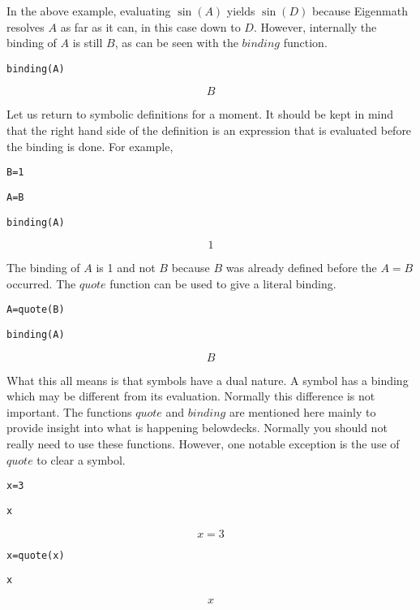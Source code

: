 \medskip
\noindent
In the above example, evaluating $\sin(A)$ yields $\sin(D)$ because Eigenmath
resolves $A$ as far as it can, in this case down to $D$.
However, internally the binding of $A$ is still $B$, as can be seen with
the $binding$ function.

\medskip
\verb$binding(A)$

$$B$$

\medskip
\noindent
Let us return to symbolic definitions for a moment.
It should be kept in mind that the right hand side of the definition is an
expression that is evaluated before the binding is done.
For example,

\medskip
\verb$B=1$

\verb$A=B$

\verb$binding(A)$

$$1$$

\medskip
\noindent
The binding of $A$ is 1 and not $B$ because $B$ was already defined before
the $A=B$ occurred.
The $quote$ function can be used to give a literal binding.

\medskip
\verb$A=quote(B)$

\verb$binding(A)$

$$B$$

\newpage

\noindent
What this all means is that symbols have a dual nature.
A symbol has a binding which may be different from its evaluation.
Normally this difference is not important.
The functions $quote$ and $binding$ are mentioned here mainly to provide insight
into what is happening belowdecks.
Normally you should not really need to use these functions.
However, one notable exception is the use of $quote$ to clear a symbol.

\medskip
\verb$x=3$

\verb$x$

$$x=3$$

\verb$x=quote(x)$

\verb$x$

$$x$$

